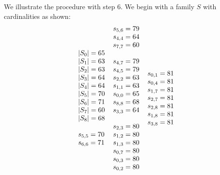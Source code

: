 \documentclass[letterpaper]{article}
\theoremstyle{definition}
\begin{document}
We illustrate the procedure with step $6$.  We begin with a family $S$ with cardinalities as shown:
\[
\arraycolsep=3.0pt
\begin{array}[t]{lllll}
 \begin{array}{l}
|S_0| = 65 \\
|S_1| = 63 \\
|S_2| = 63 \\
|S_3| = 64 \\
|S_4| = 64 \\
|S_5| = 70 \\
|S_6| = 71 \\
|S_7| = 60 \\
|S_8| = 68 \\
\\
s_{5, 5} = 70 \\
s_{6, 6} = 71 \\
\end{array}
 &
\begin{array}{l}
s_{5, 6} = 79 \\
s_{4, 4} = 64 \\
s_{7, 7} = 60 \\
\\
s_{4, 7} = 79 \\
s_{4, 5} = 79 \\
s_{2, 2} = 63 \\
s_{1, 1} = 63 \\
s_{0, 0} = 65 \\
s_{8, 8} = 68 \\
s_{3, 3} = 64 \\
\\
s_{2, 3} = 80 \\
s_{1, 2} = 80 \\
s_{1, 3} = 80 \\
s_{0, 7} = 80 \\
s_{0, 3} = 80 \\
s_{0, 2} = 80 \\
 \end{array}
&
  \begin{array}{l}
s_{0, 1} = 81 \\
s_{0, 4} = 81 \\
s_{1, 7} = 81 \\
s_{2, 7} = 81 \\
s_{2, 8} = 81 \\
s_{1, 8} = 81 \\
s_{3, 8} = 81 \\

\end{array}
\end{array}\]
\end{document}
